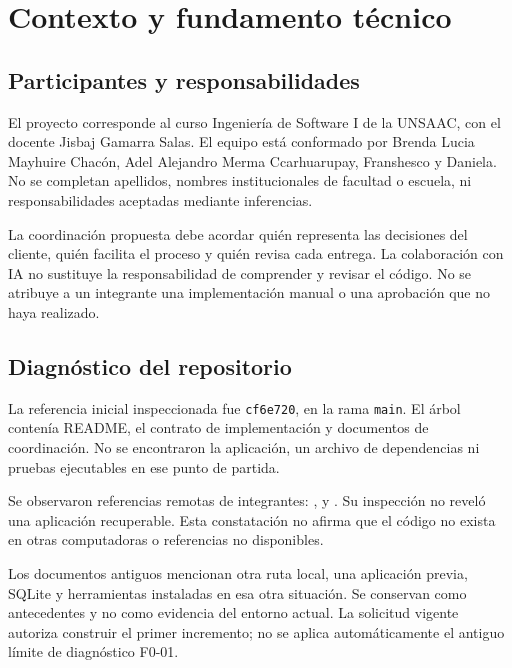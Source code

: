 \chapter{Contexto y fundamento técnico}
\section{Participantes y responsabilidades}
El proyecto corresponde al curso Ingeniería de Software I de la UNSAAC, con el docente Jisbaj Gamarra Salas. El equipo está conformado por Brenda Lucia Mayhuire Chacón, Adel Alejandro Merma Ccarhuarupay, Franshesco y Daniela. No se completan apellidos, nombres institucionales de facultad o escuela, ni responsabilidades aceptadas mediante inferencias.

La coordinación propuesta debe acordar quién representa las decisiones del cliente, quién facilita el proceso y quién revisa cada entrega. La colaboración con IA no sustituye la responsabilidad de comprender y revisar el código. No se atribuye a un integrante una implementación manual o una aprobación que no haya realizado.

\section{Diagnóstico del repositorio}
La referencia inicial inspeccionada fue \texttt{cf6e720}, en la rama \texttt{main}. El árbol contenía README, el contrato de implementación y documentos de coordinación. No se encontraron la aplicación, un archivo de dependencias ni pruebas ejecutables en ese punto de partida.

Se observaron referencias remotas de integrantes: ,  y . Su inspección no reveló una aplicación recuperable. Esta constatación no afirma que el código no exista en otras computadoras o referencias no disponibles.

Los documentos antiguos mencionan otra ruta local, una aplicación previa, SQLite y herramientas instaladas en esa otra situación. Se conservan como antecedentes y no como evidencia del entorno actual. La solicitud vigente autoriza construir el primer incremento; no se aplica automáticamente el antiguo límite de diagnóstico F0-01.

